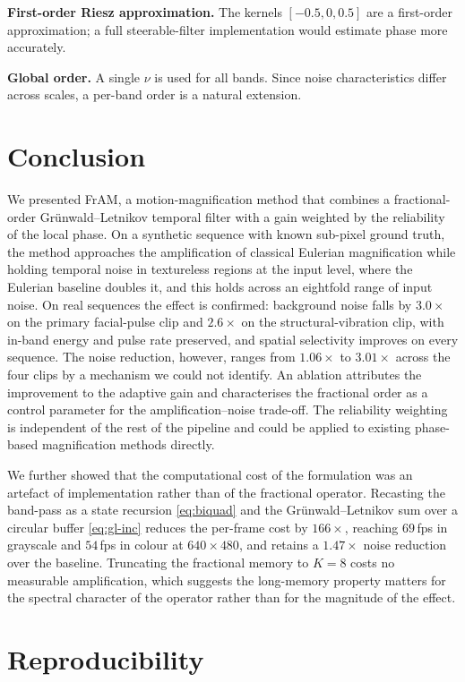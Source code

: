\documentclass[conference]{IEEEtran}
\begin{document}
\textbf{First-order Riesz approximation.} The kernels $[-0.5,0,0.5]$ are a
first-order approximation; a full steerable-filter implementation would estimate
phase more accurately.

\textbf{Global order.} A single $\nu$ is used for all bands. Since noise
characteristics differ across scales, a per-band order is a natural extension.

\section{Conclusion}

We presented FrAM, a motion-magnification method that combines a
fractional-order Gr\"unwald--Letnikov temporal filter with a gain weighted by
the reliability of the local phase. On a synthetic sequence with known
sub-pixel ground truth, the method approaches the amplification of classical
Eulerian magnification while holding temporal noise in textureless regions at
the input level, where the Eulerian baseline doubles it, and this holds
across an eightfold range of input noise. On real sequences the effect is
confirmed: background noise falls by $3.0\times$ on the primary facial-pulse
clip and $2.6\times$ on the structural-vibration clip, with in-band energy
and pulse rate preserved, and spatial selectivity improves on every sequence.
The noise reduction, however, ranges from $1.06\times$ to $3.01\times$ across
the four clips by a mechanism we could not identify. An ablation attributes
the improvement to the adaptive gain and characterises the fractional order
as a control parameter for the amplification--noise trade-off. The
reliability weighting is independent of the rest of the pipeline and could be
applied to existing phase-based magnification methods directly.

We further showed that the computational cost of the formulation was an
artefact of implementation rather than of the fractional operator. Recasting
the band-pass as a state recursion \eqref{eq:biquad} and the
Gr\"unwald--Letnikov sum over a circular buffer \eqref{eq:gl-inc} reduces the
per-frame cost by $166\times$, reaching $69$\,fps in grayscale and $54$\,fps in
colour at $640\times480$, and retains a $1.47\times$ noise reduction over the
baseline. Truncating the fractional memory to $K=8$ costs no
measurable amplification, which suggests the long-memory
property matters for the spectral character of the operator rather than for the
magnitude of the effect.

\section*{Reproducibility}
\end{document}
